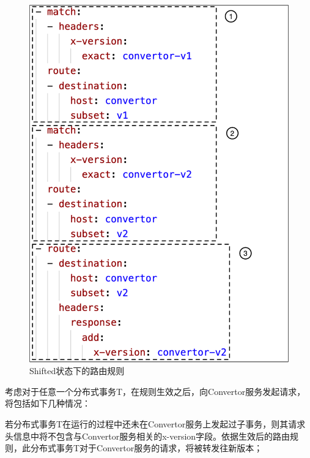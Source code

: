 \documentclass[macfonts,master]{njuthesis}
\begin{document}
\begin{figure}
\begin{minipage}[t]{0.48\textwidth}
  \centerline{\includegraphics[width=1.0\textwidth]{image/shifted_v1v2.png}}
  \caption{Shifted状态下的路由规则}
  \label{fig:shifted_v1v2}
  \end{minipage}
\end{figure}


考虑对于任意一个分布式事务T，在规则生效之后，向Convertor服务发起请求，将包括如下几种情况：

若分布式事务T在运行的过程中还未在Convertor服务上发起过子事务，则其请求头信息中将不包含与Convertor服务相关的x-version字段。依据生效后的路由规则，此分布式事务T对于Convertor服务的请求，将被转发往新版本；
\end{document}
